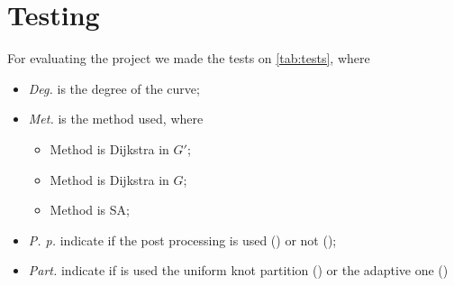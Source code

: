 \documentclass[dissertation.tex]{subfiles}
\begin{document}
\chapter{Testing}
For evaluating the project we made the tests on \cref{tab:tests},
where
\begin{itemize}
\item \emph{Deg.} is the degree of the \bs curve;
\item \emph{Met.} is the method used, where
  \begin{itemize}
  \item Method \metA is Dijkstra in $G'$;
  \item Method \metB is Dijkstra in $G$;
  \item Method \metC is \acl{SA};
  \end{itemize}
\item \emph{P. p.} indicate if the post processing is used (\ypp) or
  not (\npp);
\item \emph{Part.} indicate if is used the uniform knot partition
  (\nad) or the adaptive one (\yad)
\end{itemize}
\end{document}

